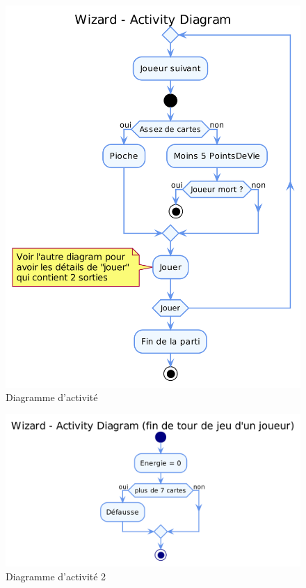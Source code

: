 \documentclass[11pt,a4paper]{article}
\begin{document}
\begin{figure}[ht]
  \centering
  \includegraphics[width=1\textwidth]{uml_files/ActivityDiagram.png}
  \caption{\label{fig:class} Diagramme d'activité}
\end{figure}

\begin{figure}[ht]
  \centering
  \includegraphics[width=1\textwidth]{uml_files/ActivityDiagram2.png}
  \caption{\label{fig:class} Diagramme d'activité 2}
\end{figure}
\end{document}
